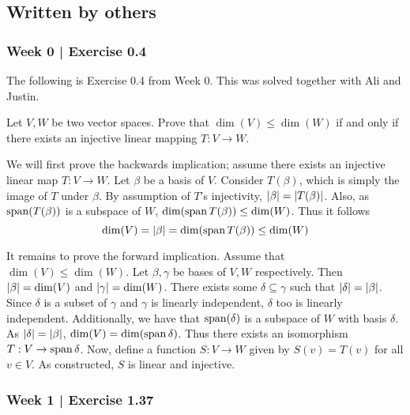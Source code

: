 \subsection{Written by others}

\subsubsection{Week 0 | Exercise 0.4}

The following is Exercise 0.4 from Week 0.
This was solved together with Ali and Justin.

\begin{exr}[num=0.4]
    Let $V,W$ be two vector spaces. Prove that $\dim(V)\leq \dim(W)$ if and only
    if there exists an injective linear mapping $T:V\rightarrow W$.
\end{exr}

\begin{pf}[source=Justin]
    We will first prove the backwards implication; assume there exists an
    injective linear map $T:V\rightarrow W$. Let $\beta$ be a basis of $V$.
    Consider $T(\beta)$, which is simply the image of $T$ under $\beta$.
    By assumption of $T$'s injectivity,
    $\abs{\beta}=\abs{T(\beta)}$. Also, as $\operatorname{span} (T(\beta))$ is a subspace of
    $W$, $\dim (\operatorname{span} T(\beta))\leq \dim (W)$. Thus it follows 
    \[
    \dim (V)=\abs{\beta}=\dim (\operatorname{span} T(\beta))\leq \dim (W)
    \]

    It remains to prove the forward implication. Assume that
    $\dim(V)\leq\dim(W)$. Let $\beta, \gamma$ be bases of $V,W$ respectively.
    Then $\abs{\beta}= \dim(V)$ and $\abs{\gamma}=\dim (W)$.
    There exists some $\delta\subseteq \gamma$ such that $\abs{\delta}
    =\abs{\beta}$. Since $\delta$ is a subset of $\gamma$ and $\gamma$ is
    linearly independent, $\delta$ too is linearly independent. \vsp
    Additionally, we have that $\operatorname{span}(\delta)$ is a subspace of $W$ with basis
    $\delta$. As $\abs{\delta}=\abs{\beta}$, $\dim(V)=\dim(\operatorname{span} \delta)$.
    Thus there exists an isomorphism $T:V\rightarrow \operatorname{span}{\delta}$.
    Now, define a function $S:V\rightarrow W$ given by 
    $S(v)=T(v)$ for all $v\in V$. As constructed, $S$ is linear and injective.
\end{pf}

\newpage
\subsubsection{Week 1 | Exercise 1.37}

